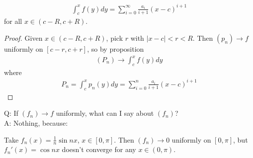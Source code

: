 \documentclass[a4paper]{article}
\begin{document}
\begin{coro}
\begin{equation*}
\begin{aligned}
\int_c^x f\left(y\right)dy = \sum_{i=0}^\infty \frac{a_i}{i+1}\left(x-c\right)^{i+1}
\end{aligned}
\end{equation*}
for all $x \in \left(c-R,c+R\right)$.
\begin{proof}
Given $x \in \left(c-R,c+R\right)$, pick $r$ with $|x-c|<r<R$. Then $\left(p_n\right) \to f$ uniformly on $\left[c-r,c+r\right]$, so by proposition
\begin{equation*}
\begin{aligned}
\left(P_n\right) \to \int_c^x f\left(y\right)dy
\end{aligned}
\end{equation*}
where
\begin{equation*}
\begin{aligned}
P_n = \int_c^x p_n\left(y\right)dy = \sum_{i=0}^n \frac{a_i}{i+1} \left(x-c\right)^{i+1}
\end{aligned}
\end{equation*}
\end{proof}
\end{coro}

Q: If $\left(f_n\right) \to f$ uniformly, what can I say about $\left(f_n\right)$?\\
A: Nothing, because:

\begin{eg}
Take $f_n\left(x\right) = \frac{1}{n}\sin nx$, $x \in \left[0,\pi\right]$. Then $\left(f_n\right) \to 0$ uniformly on $\left[0,\pi\right]$, but $f_n' \left(x\right) = \cos nx$ doesn't converge for any $x \in \left(0,\pi\right)$.
\end{eg}

\end{document}
